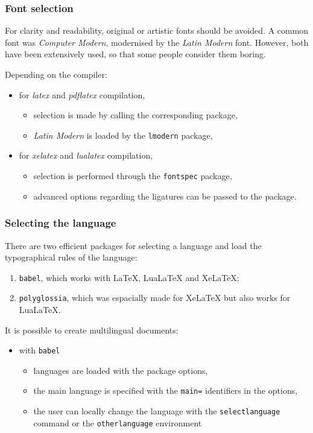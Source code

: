 \documentclass[11pt]{beamer}
\begin{document}
\begin{frame}
	\frametitle{Font selection}
	
	For clarity and readability, original or artistic fonts should be avoided.
	A common font was \textit{Computer Modern}, modernised by the \textit{Latin Modern} font. However, both have been extensively used, so that some people consider them boring.
	
	Depending on the compiler:
	\begin{itemize}
		\item for \textit{latex} and \textit{pdflatex} compilation,
		\begin{itemize}
			\item selection is made by calling the corresponding package,
			\item \textit{Latin Modern} is loaded by the \texttt{lmodern} package,
		\end{itemize}
		\item for \textit{xelatex} and \textit{lualatex} compilation,
		\begin{itemize}
			\item selection is performed through the \texttt{fontspec} package,
			\item advanced options regarding the ligatures can be passed to the package.
		\end{itemize}
	\end{itemize}
\end{frame}


\begin{frame}
	\frametitle{Selecting the language}
	
	There are two efficient packages for selecting a language and load the typographical rules of the language:
	\begin{enumerate}
		\item \texttt{babel}, which works with LaTeX, LuaLaTeX and XeLaTeX;
		\item \texttt{polyglossia}, which was espacially made for XeLaTeX but also works for LuaLaTeX.
	\end{enumerate}

	It is possible to create multilingual documents:
	\begin{itemize}
		\item with \texttt{babel}
		\begin{itemize}
			\item languages are loaded with the package options,
			\item the main language is specified with the \texttt{main=} identifiers in the options,
			\item the user can locally change the language with the \texttt{selectlanguage} command or the \texttt{otherlanguage} environment
		\end{itemize}
	\end{itemize}
\end{frame}
\end{document}
